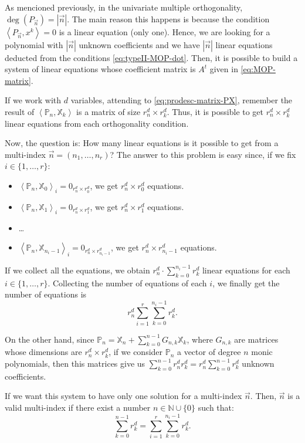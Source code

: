 \documentclass[12pt,a4]{article}
\theoremstyle{plain}
\newcommand{\N}[0]{\mathbb{N}}
\newcommand{\prodesc}[2]{\left\langle #1 , #2 \right\rangle}
\begin{document}
As mencioned previously, in the univariate multiple orthogonality, $\deg(P_{\vec n})=|\vec n|$. The main reason this happens is because the condition $\prodesc{P_{\vec n}}{x^k}=0$ is a linear equation (only one). Hence, we are looking for a polynomial with $|\vec n|$ unknown coefficients and we have $|\vec n|$ linear equations deducted from the conditions \eqref{eq:typeII-MOP-dot}. Then, it is possible to build a system of linear equations whose coefficient matrix is $A^t$ given in \eqref{eq:MOP-matrix}.

If we work with $d$ variables, attending to \eqref{eq:prodesc-matrix-PX}, remember the result of $\prodesc{\mathbb P_n}{\mathbb X_k}$ is a matrix of size $r_n^d\times r_k^d$. Thus, it is possible to get $r_n^d\times r_k^d$ linear equations from each orthogonality condition.  

Now, the question is: How many linear equations is it possible to get from a multi-index $\vec n =(n_1, \dots, n_r)$? The answer to this problem is easy since, if we fix $i\in\{1,\dots,r\}$:
\begin{itemize}
    \item $\prodesc{\mathbb P_n}{\mathbb X_0}_i = 0_{r^d_n\times r^d_0}$, we get $r^d_n\times r^d_0$ equations.
    \item $\prodesc{\mathbb P_n}{\mathbb X_1}_i = 0_{r^d_n\times r^d_1}$, we get $r^d_n\times r^d_1$ equations.
    \item \dots
    \item $\prodesc{\mathbb P_n}{\mathbb X_{n_i-1}}_i = 0_{r^d_n\times r^d_{n_i-1}}$, we get $r^d_n\times r^d_{n_i-1}$ equations.
\end{itemize} 
If we collect all the equations, we obtain $r_n^d\cdot\displaystyle\sum_{k=0}^{n_i-1}r^d_k$ linear equations for each $i\in\{1,\dots,r\}$. Collecting the number of equations of each $i$, we finally get the number of equations is 
\begin{equation}
    \label{eq:number-eqs}
    r_n^d \sum_{i=1}^r \sum_{k=0}^{n_i-1} r_k^d.
\end{equation}

On the other hand, since $\mathbb P_n = \mathbb X_n + \displaystyle\sum_{k=0}^{n-1}G_{n,k} \mathbb X_k$, where $G_{n,k}$ are matrices whose dimensions are $r^d_n\times r^d_k$, if we consider $\mathbb P_n$ a vector of degree $n$ monic polynomials, then this matrices give us $\displaystyle\sum_{k=0}^{n-1}r^d_n r^d_k=r^d_n\displaystyle\sum_{k=0}^{n-1} r^d_k$ unknown coefficients.

If we want this system to have only one solution for a multi-index $\vec n$. Then, $\vec n$ is a valid multi-index if there exist a number $n\in\N\cup\{0\}$ such that:
\begin{equation}
    \label{eq:condition-type-ii-general}
    \displaystyle\sum_{k=0}^{n-1} r^d_k = \sum_{i=1}^r \sum_{k=0}^{n_i-1} r_k^d.
\end{equation}
\end{document}
